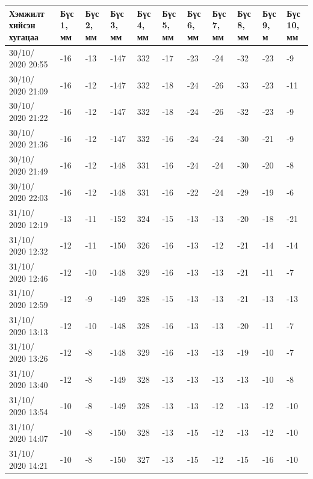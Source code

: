 \begin{table}[h]
    \centering
    \begin{tabular}{|p{1.5cm}|p{0.8cm}|p{0.8cm}|p{0.8cm}|p{0.8cm}|p{0.8cm}|p{0.8cm}|p{0.8cm}|p{0.8cm}|p{0.8cm}|p{0.8cm}|}
         \hline
     Хэмжилт хийсэн хугацаа & Бүс 1, мм&	Бүс 2, мм&	Бүс 3, мм&	Бүс 4, мм&	Бүс 5, мм&	Бүс 6, мм&	Бүс 7, мм&	Бүс 8, мм&	Бүс 9, м&	Бүс 10, мм\\ \hline
30/10/ 2020 20:55&	-16&-13&-147&	332&-17&-23&-24&-32&-23&	-9\\ \hline
30/10/ 2020 21:09&	-16&-12&-147&	332&-18&-24&-26&-33&-23&	-11\\ \hline
30/10/ 2020 21:22&	-16&-12&-147&	332&-18&-24&-26&-32&-23&	-9\\ \hline
30/10/ 2020 21:36&	-16&-12&-147&	332&-16&-24&-24&-30&-21&	-9\\ \hline
30/10/ 2020 21:49&	-16&-12&-148&	331&-16&-24&-24&-30&-20&	-8\\ \hline
30/10/ 2020 22:03&	-16&-12&-148&	331&-16&-22&-24&-29&-19&	-6\\ \hline
31/10/ 2020 12:19&	-13&-11&-152&	324&-15&-13&-13&-20&-18&	-21\\ \hline
31/10/ 2020 12:32&	-12&-11&-150&	326&-16&-13&-12&-21&-14&	-14\\ \hline
31/10/ 2020 12:46&	-12&-10&-148&	329&-16&-13&-13&-21&-11&	-7\\ \hline
31/10/ 2020 12:59&	-12&-9&	-149&	328&-15&-13&-13&-21&-13&	-13\\ \hline
31/10/ 2020 13:13&	-12&-10&-148&	328&-16&-13&-13&-20&-11&	-7\\ \hline
31/10/ 2020 13:26&	-12&-8&	-148&	329&-16&-13&-13&-19&-10&	-7\\ \hline
31/10/ 2020 13:40&	-12&-8&	-149&	328&-13&-13&-13&-13&-10&	-8\\ \hline
31/10/ 2020 13:54&	-10&-8&	-149&	328&-13&-13&-12&-13&-12&	-10\\ \hline
31/10/ 2020 14:07&	-10&-8&	-150&	328&-13&-15&-12&-13&-12&	-10\\ \hline
31/10/ 2020 14:21&	-10&-8&	-150&	327&-13&-15&-12&-15&-16&	-10\\ \hline
    \end{tabular}
\end{table}
